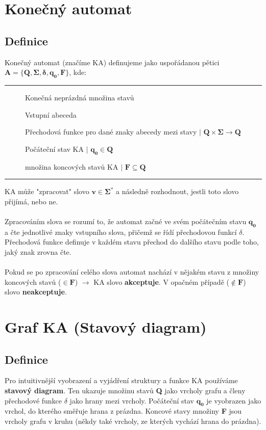 \documentclass{report}
\begin{document}
\section{Konečný automat}

\subsection*{Definice}
    Konečný automat (značíme KA) definujeme jako uspořádanou pětici $\mathbf{A = \{Q,\Sigma,\delta,q_0,F\}}$, kde:
\vspace{0.4cm}    
\hrule
\vspace{0.1cm}
    \begin{description}
        \item[] Konečná neprázdná množina stavů
        \item[\fbox{$\mathbf{\Sigma}$}] Vstupní abeceda
        \item[\fbox{$\mathbf{\delta}$}] Přechodová funkce pro dané znaky abecedy mezi stavy $\mid$ $\mathbf{Q \times \Sigma \rightarrow Q}$
        \item[] Počáteční stav KA $\mid$ $\mathbf{q_0 \in Q}$
        \item[] množina koncových stavů KA $\mid$ $\mathbf{F \subseteq Q}$
    \end{description}
\vspace{0.1cm}    
\hrule
\vspace{0.4cm}  
KA může "zpracovat" slovo $\mathbf{v \in \Sigma^*}$ a následně rozhodnout, jestli toto slovo přijímá, nebo ne.
    \\ \\
     Zpracováním slova se rozumí to, že automat začné ve svém počátečním stavu $\mathbf{q_0}$ a čte jednotlivé znaky vstupního slova, přičemž se řídí přechodovou funkcí $\delta$. Přechodová funkce definuje v každém stavu přechod do dalšího stavu podle toho, jaký znak zrovna čte.
     \\ \\ 
     Pokud se po zpracování celého slova automat nachází v nějakém stavu z množiny koncových stavů ($\mathbf{\in F}$) $\mathbf{\rightarrow}$ KA slovo \textbf{akceptuje}. V opačném případě ($\mathbf{\notin F}$) slovo \textbf{neakceptuje}.

\section{Graf KA (Stavový diagram)}
\subsection*{Definice}
Pro intuitivnější vyobrazení a vyjádření struktury a funkce KA používáme \textbf{stavový diagram}. Ten ukazuje množinu stavů \textbf{Q} jako vrcholy grafu a členy přechodové funkce $\delta$ jako hrany mezi vrcholy. Počáteční stav $\mathbf{q_0}$ je vyobrazen jako vrchol, do kterého směřuje hrana z prázdna. Koncové stavy množiny \textbf{F} jsou vrcholy grafu v kruhu (někdy také vrcholy, ze kterých vychází hrana do prázdna).
\end{document}
